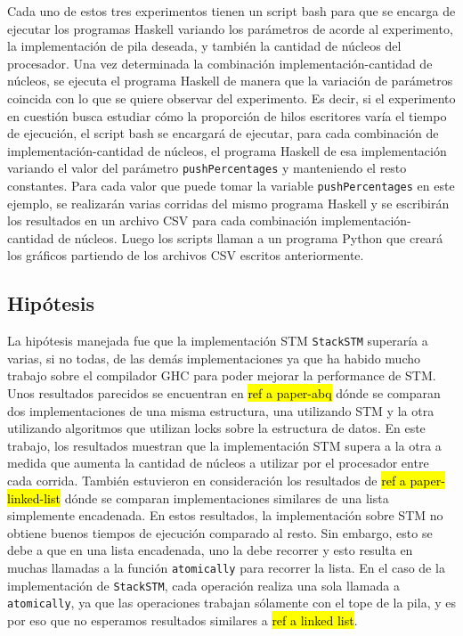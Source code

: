 Cada uno de estos tres experimentos tienen un script bash para que se encarga de ejecutar los programas Haskell variando los parámetros de acorde al experimento, la implementación de pila deseada, y también la cantidad de núcleos del procesador. Una vez determinada la combinación implementación-cantidad de núcleos, se ejecuta el programa Haskell de manera que la variación de parámetros coincida con lo que se quiere observar del experimento. Es decir, si el experimento en cuestión busca estudiar cómo la proporción de hilos escritores varía el tiempo de ejecución, el script bash se encargará de ejecutar, para cada combinación de implementación-cantidad de núcleos, el programa Haskell de esa implementación variando el valor del parámetro \texttt{pushPercentages} y manteniendo el resto constantes. Para cada valor que puede tomar la variable \texttt{pushPercentages} en este ejemplo, se realizarán varias corridas del mismo programa Haskell y se escribirán los resultados en un archivo CSV para cada combinación implementación-cantidad de núcleos. Luego los scripts llaman a un programa Python que creará los gráficos partiendo de los archivos CSV escritos anteriormente.

\subsection{Hipótesis}
La hipótesis manejada fue que la implementación STM \texttt{StackSTM} superaría a varias, si no todas, de las demás implementaciones ya que ha habido mucho trabajo sobre el compilador GHC para poder mejorar la performance de STM. Unos resultados parecidos se encuentran en \hl{ref a paper-abq} dónde se comparan dos implementaciones de una misma estructura, una utilizando STM y la otra utilizando algoritmos que utilizan locks sobre la estructura de datos. En este trabajo, los resultados muestran que la implementación STM supera a la otra a medida que aumenta la cantidad de núcleos a utilizar por el procesador entre cada corrida.
También estuvieron en consideración los resultados de \hl{ref a paper-linked-list} dónde se comparan implementaciones similares de una lista simplemente encadenada. En estos resultados, la implementación sobre STM no obtiene buenos tiempos de ejecución comparado al resto. Sin embargo, esto se debe a que en una lista encadenada, uno la debe recorrer y esto resulta en muchas llamadas a la función \texttt{atomically} para recorrer la lista. En el caso de la implementación de \texttt{StackSTM}, cada operación realiza una sola llamada a \texttt{atomically}, ya que las operaciones trabajan sólamente con el tope de la pila, y es por eso que no esperamos resultados similares a \hl{ref a linked list}.


